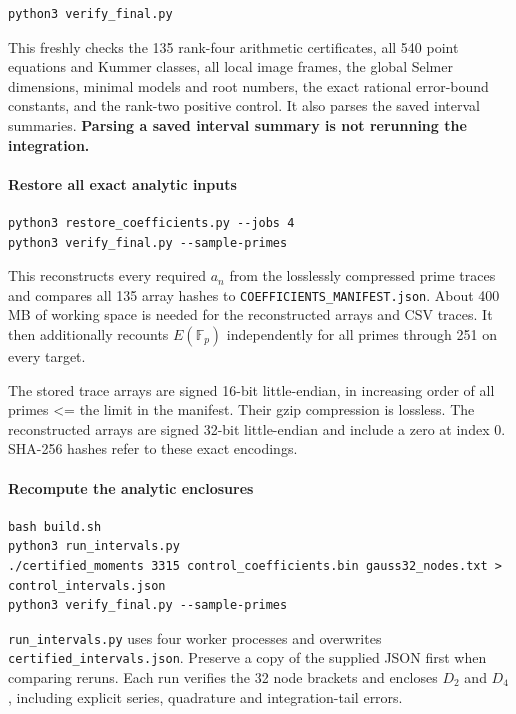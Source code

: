 \documentclass[11pt]{article}
\begin{document}
\begin{Verbatim}[breaklines=true,breakanywhere=true,fontsize=\small]
python3 verify_final.py
\end{Verbatim}

This freshly checks the 135 rank-four arithmetic certificates, all 540 point equations and Kummer classes, all local image frames, the global Selmer dimensions, minimal models and root numbers, the exact rational error-bound constants, and the rank-two positive control. It also parses the saved interval summaries. \textbf{Parsing a saved interval summary is not rerunning the integration.}

\paragraph{Restore all exact analytic inputs}

\begin{Verbatim}[breaklines=true,breakanywhere=true,fontsize=\small]
python3 restore_coefficients.py --jobs 4
python3 verify_final.py --sample-primes
\end{Verbatim}

This reconstructs every required \(a_n\) from the losslessly compressed prime traces and compares all 135 array hashes to \nolinkurl{COEFFICIENTS_MANIFEST.json}. About 400 MB of working space is needed for the reconstructed arrays and CSV traces. It then additionally recounts \(E(\mathbb F_p)\) independently for all primes through 251 on every target.

The stored trace arrays are signed 16-bit little-endian, in increasing order of all primes \textless= the limit in the manifest. Their gzip compression is lossless. The reconstructed arrays are signed 32-bit little-endian and include a zero at index 0. SHA-256 hashes refer to these exact encodings.

\paragraph{Recompute the analytic enclosures}

\begin{Verbatim}[breaklines=true,breakanywhere=true,fontsize=\small]
bash build.sh
python3 run_intervals.py
./certified_moments 3315 control_coefficients.bin gauss32_nodes.txt > control_intervals.json
python3 verify_final.py --sample-primes
\end{Verbatim}

\nolinkurl{run_intervals.py} uses four worker processes and overwrites \nolinkurl{certified_intervals.json}. Preserve a copy of the supplied JSON first when comparing reruns. Each run verifies the 32 node brackets and encloses \(D_2\) and \(D_4\), including explicit series, quadrature and integration-tail errors.
\end{document}
